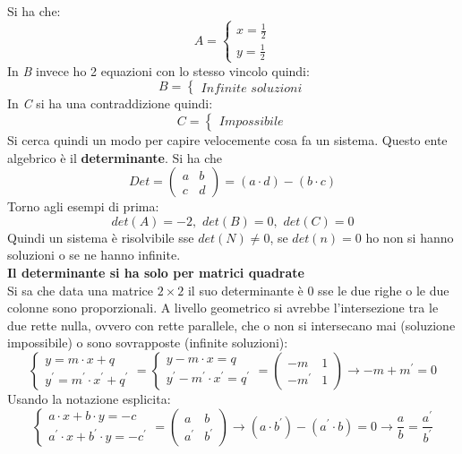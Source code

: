 \documentclass[a4paper,12pt, oneside]{book}
\begin{document}
Si ha che:
$$
	A=\begin{cases}
		x=\frac{1}{2} \\
		y=\frac{1}{2}
	\end{cases}
$$
In \textit{B} invece ho 2 equazioni con lo stesso vincolo quindi:
$$
	B=\begin{cases}
		Infinite\,\, soluzioni
	\end{cases}
$$
In \textit{C} si ha una contraddizione quindi:
$$
	C=\begin{cases}
		Impossibile
	\end{cases}
$$
Si cerca quindi un modo per capire velocemente cosa fa un sistema. Questo ente algebrico è il \textbf{determinante}.
Si ha che
$$
	Det=\left(
	\begin{matrix}
			a & b \\
			c & d
		\end{matrix}
	\right)=(a\cdot d)-(b\cdot c)
$$
Torno agli esempi di prima:
$$det(A)=-2,\,\, det(B)=0,\,\,det(C)=0$$
Quindi un sistema è risolvibile sse $det(N)\neq 0$, se $det(n)=0$ ho non si hanno soluzioni o se ne hanno infinite.\\
\textbf{Il determinante si ha solo per matrici quadrate}\\
Si sa che data una matrice $2\times 2$ il suo determinante è 0 sse le due righe o le due colonne sono proporzionali. A livello geometrico si avrebbe l'intersezione tra le due rette nulla, ovvero con rette parallele, che o non si intersecano mai (soluzione impossibile) o sono sovrapposte (infinite soluzioni):
$$\begin{cases}
		y=m\cdot x+q \\
		y^{'}=m^{'}\cdot x^{'}+q^{'}
	\end{cases}=
	\begin{cases}
		y-m\cdot x=q \\
		y^{'}-m^{'}\cdot x^{'}=q^{'}
	\end{cases}=
	\left(
	\begin{matrix}
			-m     & 1 \\
			-m^{'} & 1
		\end{matrix}
	\right)\rightarrow -m+m^{'}=0
$$
Usando la notazione esplicita:
$$
	\begin{cases}
		a\cdot x+b\cdot y=-c \\
		a^{'}\cdot x+b^{'}\cdot y=-c^{'}
	\end{cases}=
	\left(
	\begin{matrix}
			a     & b     \\
			a^{'} & b^{'}
		\end{matrix}
	\right)\rightarrow (a\cdot b^{'})-(a^{'}\cdot b)=0\rightarrow \frac{a}{b}=\frac{a^{'}}{b^{'}}
$$
\end{document}
